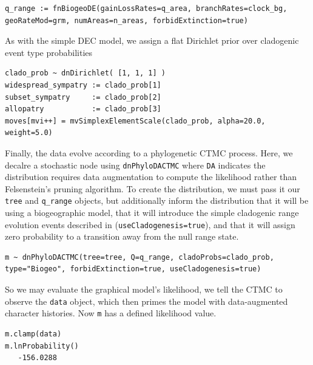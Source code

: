 \begin{snugshade}
\begin{lstlisting}
q_range := fnBiogeoDE(gainLossRates=q_area, branchRates=clock_bg, geoRateMod=grm, numAreas=n_areas, forbidExtinction=true)
\end{lstlisting}
\end{snugshade}

As with the simple DEC model, we assign a flat Dirichlet prior over cladogenic event type probabilities

\begin{snugshade}
\begin{lstlisting}
clado_prob ~ dnDirichlet( [1, 1, 1] )
widespread_sympatry := clado_prob[1]
subset_sympatry     := clado_prob[2]
allopatry           := clado_prob[3]
moves[mvi++] = mvSimplexElementScale(clado_prob, alpha=20.0, weight=5.0)
\end{lstlisting}
\end{snugshade}

Finally, the data evolve according to a phylogenetic CTMC process. Here, we decalre a stochastic node using {\tt dnPhyloDACTMC} where {\tt DA} indicates the distribution requires data augmentation to compute the likelihood rather than Felsenstein's pruning algorithm.
To create the distribution, we must pass it our {\tt tree} and {\tt q\_range} objects, but additionally inform the distribution that it will be using a biogeographic model, that it will introduce the simple cladogenic range evolution events described in \citet{ree08} ({\tt useCladogenesis=true}), and that it will assign zero probability to a transition away from the null range state.

\begin{snugshade}
\begin{lstlisting}
m ~ dnPhyloDACTMC(tree=tree, Q=q_range, cladoProbs=clado_prob, type="Biogeo", forbidExtinction=true, useCladogenesis=true)
\end{lstlisting}
\end{snugshade}


So we may evaluate the graphical model's likelihood, we tell the CTMC to observe the {\tt data} object, which then primes the model with data-augmented character histories.
Now {\tt m} has a defined likelihood value.
\begin{snugshade}
\begin{lstlisting}
m.clamp(data)
m.lnProbability()
   -156.0288
\end{lstlisting}
\end{snugshade}


